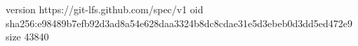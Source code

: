 version https://git-lfs.github.com/spec/v1
oid sha256:e98489b7efb92d3ad8a54e628daa3324b8dc8cdae31e5d3ebeb0d3dd5ed472e9
size 43840
